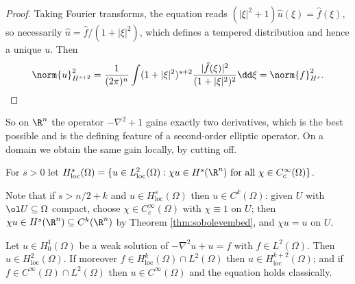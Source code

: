 \begin{proof}
	Taking Fourier transforms, the equation reads $(|\xi|^2+1)\hat u(\xi)=\hat f(\xi)$, so necessarily $\hat u = \hat f/(1+|\xi|^2)$, which defines a tempered distribution and hence a unique $u$. Then
	$$\norm{u}^2_{H^{s+2}}=\frac{1}{(2\pi)^n}\int(1+|\xi|^2)^{s+2}\frac{|\hat f(\xi)|^2}{(1+|\xi|^2)^2}\dd\xi=\norm{f}^2_{H^s}. \qedhere$$
\end{proof}

So on $\R^n$ the operator $-\nabla^2+1$ gains exactly two derivatives, which is the best possible and is the defining feature of a second-order elliptic operator. On a domain we obtain the same gain locally, by cutting off.

\begin{definition}
	For $s>0$ let $H^s_{\mathrm{loc}}(\Omega)=\{u\in L^2_{\mathrm{loc}}(\Omega) : \chi u \in H^s(\R^n)\text{ for all }\chi\in C_c^\infty(\Omega)\}$.
\end{definition}

Note that if $s>n/2+k$ and $u \in H^s_{\mathrm{loc}}(\Omega)$ then $u \in C^k(\Omega)$: given $U$ with $\ol U\subseteq\Omega$ compact, choose $\chi\in C_c^\infty(\Omega)$ with $\chi\equiv1$ on $U$; then $\chi u \in H^s(\R^n)\subseteq C^k(\R^n)$ by Theorem \ref{thm:sobolevembed}, and $\chi u = u$ on $U$.

\begin{theorem}\label{thm:ellipticreg}
	Let $u \in H_0^1(\Omega)$ be a weak solution of $-\nabla^2u+u=f$ with $f\in L^2(\Omega)$. Then $u \in H^2_{\mathrm{loc}}(\Omega)$. If moreover $f \in H^k_{\mathrm{loc}}(\Omega)\cap L^2(\Omega)$ then $u \in H^{k+2}_{\mathrm{loc}}(\Omega)$; and if $f \in C^\infty(\Omega)\cap L^2(\Omega)$ then $u \in C^\infty(\Omega)$ and the equation holds classically.
\end{theorem}

